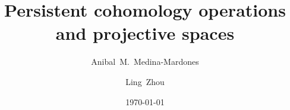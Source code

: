 \documentclass{amsart}
\title[Persistent cohomology operations and projective spaces]{Persistent cohomology operations \\ and projective spaces}
\author{Anibal~M.~Medina-Mardones}
\author{Ling~Zhou}
\date{\today}
\begin{document}
	
	\maketitle
	\tableofcontents
	\newpage
	
	
	
	
	
	
	\sloppy
	\printbibliography
%	
\end{document}
